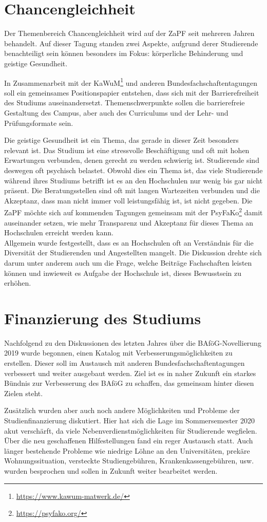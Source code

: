 \documentclass{scrartcl}
\begin{document}
\section*{Chancengleichheit}
Der Themenbereich Chancengleichheit wird auf der ZaPF seit mehreren Jahren behandelt. Auf dieser Tagung standen zwei Aspekte, aufgrund derer Studierende benachteiligt sein können besonders im Fokus: körperliche Behinderung und geistige Gesundheit.

In Zusammenarbeit mit der KaWuM\footnote{\href{https://www.kawum-matwerk.de/}{https://www.kawum-matwerk.de/}} und anderen Bundesfachschaftentagungen soll ein gemeinsames Positionspapier entstehen, dass sich mit der Barrierefreiheit des Studiums auseinandersetzt. Themenschwerpunkte sollen die barrierefreie Gestaltung des Campus, aber auch des Curriculums und der Lehr-  und Prüfungsformate sein.

Die geistige Gesundheit ist ein Thema, das gerade in dieser Zeit besonders relevant ist. Das Studium ist eine stressvolle Beschäftigung und oft mit hohen Erwartungen verbunden, denen gerecht zu werden schwierig ist. Studierende sind deswegen oft psychisch belastet. Obwohl dies ein Thema ist, das viele Studierende während ihres Studiums betrifft ist es an den Hochschulen nur wenig bis gar nicht präsent. Die Beratungsstellen sind oft mit langen Wartezeiten verbunden und die Akzeptanz, dass man nicht immer voll leistungsfähig ist, ist nicht gegeben.
Die ZaPF möchte sich auf kommenden Tagungen gemeinsam mit der PsyFaKo\footnote{\href{https://psyfako.org/}{https://psyfako.org/}} damit auseinander setzen, wie mehr Transparenz und Akzeptanz für dieses Thema an Hochschulen erreicht werden kann. \\
Allgemein wurde festgestellt, dass es an Hochschulen oft an Verständnis für die Diversität der Studierenden und Angestellten mangelt. Die Diskussion drehte sich darum unter anderem auch um die Frage, welche Beiträge Fachschaften leisten können und inwieweit es Aufgabe der Hochschule ist, dieses Bewusstsein zu erhöhen.

\section*{Finanzierung des Studiums}
Nachfolgend zu den Diskussionen des letzten Jahres über die BAföG-Novellierung 2019 wurde begonnen, einen Katalog mit Verbesserungsmöglichkeiten zu erstellen. Dieser soll im Austausch mit anderen Bundesfachschaftentagungen verbessert und weiter ausgebaut werden. Ziel ist es in naher Zukunft ein starkes Bündnis zur Verbesserung des BAföG zu schaffen, das gemeinsam hinter diesen Zielen steht.

Zusätzlich wurden aber auch noch andere Möglichkeiten und Probleme der Studienfinanzierung diskutiert. Hier hat sich die Lage im Sommersemester 2020 akut verschärft, da viele Nebenverdienstmöglichkeiten für Studierende wegfielen. Über die neu geschaffenen Hilfestellungen fand ein reger Austausch statt. Auch länger bestehende Probleme wie niedrige Löhne an den Universitäten, prekäre Wohnungssituation, versteckte Studiengebühren, Krankenkassengebühren, usw. wurden besprochen und sollen in Zukunft weiter bearbeitet werden.
\end{document}
